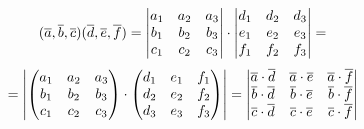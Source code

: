 \documentclass[main]{subfiles}
\begin{document}
    \begin{Proof}
        \[(\overline{a}, \overline{b}, \overline{c})(\overline{d}, \overline{e}, \overline{f}) = \begin{vmatrix}
            a_1 & a_2 & a_3\\
            b_1 & b_2 & b_3\\
            c_1 & c_2 & c_3
        \end{vmatrix} \cdot \begin{vmatrix}
            d_1 & d_2 & d_3\\
            e_1 & e_2 & e_3\\
            f_1 & f_2 & f_3
        \end{vmatrix} =\]
        \[= \begin{vmatrix}
            \begin{pmatrix}
                a_1 & a_2 & a_3\\
                b_1 & b_2 & b_3\\
                c_1 & c_2 & c_3
            \end{pmatrix}
            \cdot
            \begin{pmatrix}
                d_1 & e_1 & f_1\\
                d_2 & e_2 & f_2\\
                d_3 & e_3 & f_3
            \end{pmatrix}
        \end{vmatrix} = \begin{vmatrix}
            \overline{a}\cdot\overline{d} & \overline{a}\cdot\overline{e} & \overline{a}\cdot\overline{f}\\
            \overline{b}\cdot\overline{d} & \overline{b}\cdot\overline{e} & \overline{b}\cdot\overline{f}\\
            \overline{c}\cdot\overline{d} & \overline{c}\cdot\overline{e} & \overline{c}\cdot\overline{f}
        \end{vmatrix}\]
    \end{Proof}
\end{document}
